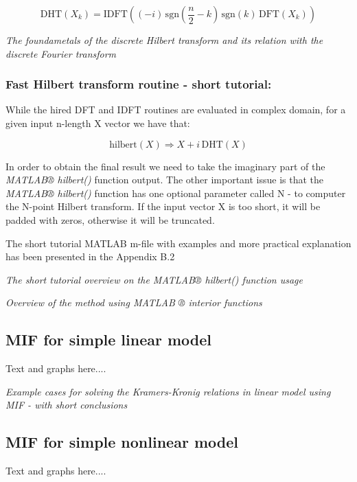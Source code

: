 \documentclass[12pt,twoside,a4paper]{article}
\numberwithin{equation}{subsection}
\numberwithin{figure}{subsection}
\begin{document}
\begin{equation} \label{eq:matlab_fulldhthdf}
  \mathrm{DHT}({X_{k}})=\mathrm{IDFT}(( - i)\,\mathrm{sgn}(\frac {n}{2} - k)\,\mathrm{sgn}(k)\,\mathrm{DFT}({X_{k}}))
\end{equation}

\textit{The foundametals of the discrete Hilbert transform and its relation with the discrete Fourier transform}

\subsubsection*{Fast Hilbert transform routine - short tutorial:}

While the hired DFT and IDFT routines are evaluated in complex domain, for a given input n-length X vector we have that:

\begin{equation} \label{eq:matlab_implication}
  \mathrm{hilbert}(X) \Rightarrow X + i\,\mathrm{DHT}(X)
\end{equation}

In order to obtain the final result we need to take the imaginary part of the \textit{MATLAB® hilbert() }function output. The other
important issue is that the \textit{MATLAB® hilbert()} function has one optional parameter called N - to computer the N-point Hilbert transform. If the input vector X is too short, it will be padded with zeros, otherwise it will be truncated.

The short tutorial MATLAB m-file with examples and more practical explanation has been presented in the Appendix B.2

\textit{The short tutorial overview on the MATLAB® hilbert() function usage}

\textit{Overview of the method using MATLAB ® interior functions}

\subsection{MIF for simple linear model} \label{chap:matlab_lin}

Text and graphs here.... 

\textit{Example cases for solving the Kramers-Kronig relations in linear model using MIF - with short conclusions}

\subsection{MIF for simple nonlinear model} \label{chap:matlab_nlo}
Text and graphs here.... 
\end{document}
